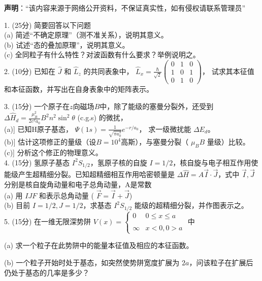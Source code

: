 
\textbf{声明}：“该内容来源于网络公开资料，不保证真实性，如有侵权请联系管理员”



1. (25分) 简要回答以下问题\\
(a) 简述“不确定原理”（测不准关系），说明其意义。\\
(b) 试述“态的叠加原理”，说明其意义。\\
(c) 全同粒子有什么特性？对波函数有什么要求？举例说明之。\\

2. (10分) 已知在 $\hat{J}$ 和 $\hat{L}_z$ 的共同表象中， $\hat{L}_x = \frac{\hbar}{\sqrt{2}} \begin{pmatrix} 
0 & 1 & 0 \\
1 & 0 & 1 \\
0 & 1 & 0 
\end{pmatrix}$， 试求其本征值和本征函数，并写出在自身表象中的矩阵表示。

3. (15分) 一个原子在$z$向磁场$B$中，除了能级的塞曼分裂外，还受到 $\Delta \hat{H}_d = \frac{\mu_B^2}{2c^2a_0} B^2 n^2 \sin^2 \theta$ (c.g.s) 的微扰，\\
(a)] 已知H原子基态， $\Psi (1s) = \frac{1}{\sqrt{\pi a_0^3}} e^{-r/a_0}$， 求一级微扰能 $ \Delta E_d$。\\
(b)] 估计这项修正的量级（设$B=10^4$高斯），与塞曼分裂（ $\mu_B B$ 量级）比较。\\
(c)] 分析这个修正的物理意义。\\

4. (15分) 氢原子基态 $I^2S_{1/2}$，氢原子核的自旋 $I=1/2$，核自旋与电子相互作用使能级产生超精细分裂。已知超精细相互作用哈密顿量是 $\Delta\hat H = A \vec{I} \cdot \vec{J}$，式中 $\vec{I}, \vec{J}$ 分别是核自旋角动量和电子总角动量，A是常数\\
(a) 用 $I J F$ 和表示总角动量 ( $\vec{F} = \vec{I} + \vec{J}$)\\
(b) 目前 $I = 1/2, J = 1/2$，求基态 $I^2S_{1/2}$ 能级的超精细分裂，并作图表示之。\\

5. (15分) 在一维无限深势阱 $V(x) = 
\begin{cases} 
0 & 0 \leq x \leq a \\\\
\infty & x < 0, 0 > a 
\end{cases}$
中

(a) 求一个粒子在此势阱中的能量本征值及相应的本征函数。

(b) 一个粒子开始时处于基态，如突然使势阱宽度扩展为 $2a$，问该粒子在扩展后仍处于基态的几率是多少？